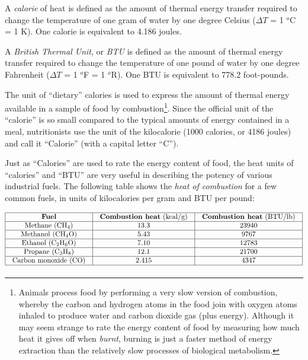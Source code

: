 A \textit{calorie} of heat is defined as the amount of thermal energy transfer required to change the temperature of one gram of water by one degree Celsius ($\Delta T$ = 1 $^{o}$C = 1 K).  One calorie is equivalent to 4.186 joules.

A \textit{British Thermal Unit}, or \textit{BTU} is defined as the amount of thermal energy transfer required to change the temperature of one pound of water by one degree Fahrenheit ($\Delta T$ = 1 $^{o}$F = 1 $^{o}$R).  One BTU is equivalent to 778.2 foot-pounds.

The unit of ``dietary'' calories is used to express the amount of thermal energy available in a sample of food by combustion\footnote{Animals process food by performing a very slow version of combustion, whereby the carbon and hydrogen atoms in the food join with oxygen atoms inhaled to produce water and carbon dioxide gas (plus energy).  Although it may seem strange to rate the energy content of food by measuring how much heat it gives off when \textit{burnt}, burning is just a faster method of energy extraction than the relatively slow processes of biological metabolism.}.  Since the official unit of the ``calorie'' is so small compared to the typical amounts of energy contained in a meal, nutritionists use the unit of the kilocalorie (1000 calories, or 4186 joules) and call it ``Calorie'' (with a capital letter ``C'').

\vskip 10pt

\filbreak

Just as ``Calories'' are used to rate the energy content of food, the heat units of ``calories'' and ``BTU'' are very useful in describing the potency of various industrial fuels.  The following table shows the \textit{heat of combustion} for a few common fuels, in units of kilocalories per gram and BTU per pound:


$$\vbox{\offinterlineskip
\halign{\strut
\vrule \quad\hfil # \ \hfil & 
\vrule \quad\hfil # \ \hfil & 
\vrule \quad\hfil # \ \hfil \vrule \cr
\noalign{\hrule}
%
\textbf{Fuel} & \textbf{Combustion heat} (kcal/g) & \textbf{Combustion heat} (BTU/lb) \cr
%
\noalign{\hrule}
%
Methane (CH$_{4}$) & 13.3 & 23940 \cr
%
\noalign{\hrule}
%
Methanol (CH$_{4}$O) & 5.43 & 9767 \cr
%
\noalign{\hrule}
%
Ethanol (C$_{2}$H$_{6}$O) & 7.10 & 12783 \cr
%
\noalign{\hrule}
%
Propane (C$_{3}$H$_{8}$) & 12.1 & 21700 \cr
%
\noalign{\hrule}
%
Carbon monoxide (CO) & 2.415 & 4347 \cr
%
\noalign{\hrule}
} %
}$$ %

